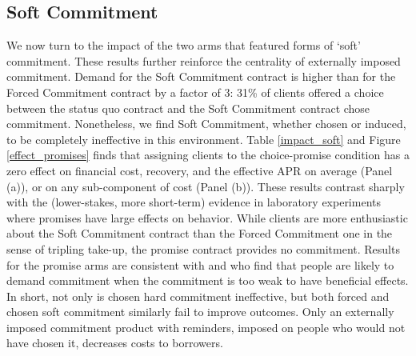 \documentclass[oneside,11pt]{article}
\begin{document}
\subsection{Soft Commitment}

We now turn to the impact of the two arms that featured forms of `soft' commitment.  These results further reinforce the centrality of externally imposed commitment. 
Demand for the Soft Commitment contract  is higher than for the Forced Commitment contract by a factor of 3: {31}\% of clients offered a choice between the status quo contract and the Soft Commitment contract chose commitment.  %
Nonetheless, we find Soft Commitment, whether chosen or induced, to be completely ineffective in this environment.  Table \ref{impact_soft} and  Figure \ref{effect_promises} finds that assigning clients to the choice-promise condition has a zero effect on financial cost, recovery, and the effective APR on average (Panel (a)), or on any sub-component of cost (Panel (b)). These results contrast sharply with the (lower-stakes, more short-term) evidence in laboratory experiments where promises have large effects on behavior. While clients are more enthusiastic about the Soft Commitment contract than the Forced Commitment one in the sense of tripling take-up, the promise contract provides no commitment. Results for the promise arms are consistent with \cite{Ted} and \cite{John} who find that people are likely to demand commitment when the commitment is too weak to have beneficial effects.  In short, not only is chosen hard commitment ineffective, but both forced and chosen soft commitment similarly fail to improve outcomes.  Only an externally imposed commitment product with reminders, imposed on people who would not have chosen it, decreases costs to borrowers.
   
\end{document}
